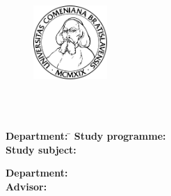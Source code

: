 \frontmatter
\thispagestyle{empty}
\pagestyle{empty}
\noindent

\begin{centering}
  {\Large\sc \school} \\
  {\Large\sc \faculty} \\
\end{centering}

\bigskip\bigskip

\begin{figure}[h]
  \centering
  \includegraphics[width=0.25\textwidth]{komlogo-new}
\end{figure}

\vspace*{2cm}
\bigskip\smallskip

\begin{center}
  \huge\sc \thesisname
\end{center}
\bigskip

\centerline{\large\mfthesistype}
\bigskip\bigskip

{\vfill\noindent\mfyear\hfill\mfauthor}
\newpage

\thispagestyle{empty}

\begin{centering}
  {\Large\sc \school} \\
  {\Large\sc \faculty} \\
\end{centering}
\vspace*{8cm}

\begin{center}
    \huge\sc \thesisname
\end{center}
\bigskip

\centerline{\large\mfthesistype}
\bigskip\bigskip

\vfill
\bigskip\bigskip
\bigskip\bigskip
\bigskip\bigskip
\begin{tabbing}
    \textbf{Department:} \quad\quad\quad\= \department\kill
    \textbf{Study programme:} \quad\quad\quad\> \programme \\
    \textbf{Study subject:} \quad\quad\quad\> \subject \\
    \textbf{Department:} \quad\quad\quad\> \department \\
    \textbf{Advisor:} \quad\quad\quad\> \mfadvisor \\
\end{tabbing}

